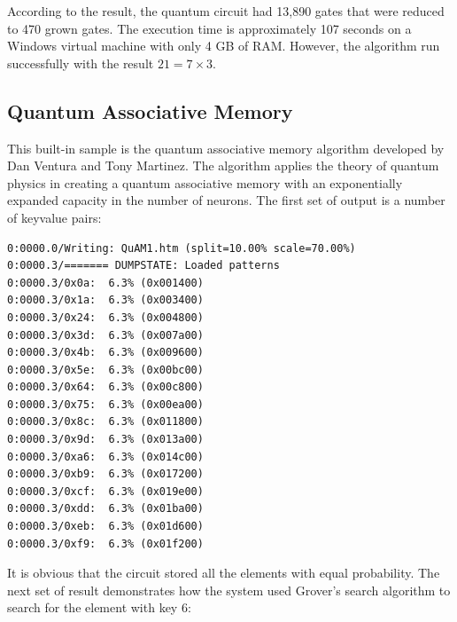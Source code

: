 \documentclass[12pt]{third-rep}
\begin{document}
According to the result, the quantum circuit had 13,890 gates that were reduced to 470 grown gates. The execution time is approximately 107 seconds on a Windows virtual machine with only 4 GB of RAM. However, the algorithm run successfully with the result $21 = 7\times3$.

\subsection{Quantum Associative Memory}
This built-in sample is the quantum associative memory algorithm developed by Dan Ventura and Tony Martinez. The algorithm applies the theory of quantum physics in creating a quantum associative memory with an exponentially expanded capacity in the number of neurons. The first set of output is a number of key\/value pairs:
\begin{verbatim}
0:0000.0/Writing: QuAM1.htm (split=10.00% scale=70.00%)
0:0000.3/======= DUMPSTATE: Loaded patterns
0:0000.3/0x0a:  6.3% (0x001400)
0:0000.3/0x1a:  6.3% (0x003400)
0:0000.3/0x24:  6.3% (0x004800)
0:0000.3/0x3d:  6.3% (0x007a00)
0:0000.3/0x4b:  6.3% (0x009600)
0:0000.3/0x5e:  6.3% (0x00bc00)
0:0000.3/0x64:  6.3% (0x00c800)
0:0000.3/0x75:  6.3% (0x00ea00)
0:0000.3/0x8c:  6.3% (0x011800)
0:0000.3/0x9d:  6.3% (0x013a00)
0:0000.3/0xa6:  6.3% (0x014c00)
0:0000.3/0xb9:  6.3% (0x017200)
0:0000.3/0xcf:  6.3% (0x019e00)
0:0000.3/0xdd:  6.3% (0x01ba00)
0:0000.3/0xeb:  6.3% (0x01d600)
0:0000.3/0xf9:  6.3% (0x01f200)
\end{verbatim}
It is obvious that the circuit stored all the elements with equal probability. The next set of result demonstrates how the system used Grover's search algorithm to search for the element with key 6:
\end{document}
